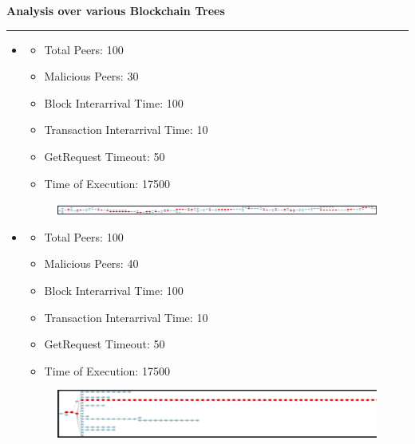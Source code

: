 \documentclass[a4paper,12pt]{article}
\newenvironment{solution}[2][]{%
\begin{mdframed}[linecolor=blue!70!black, linewidth=2pt, roundcorner=10pt, backgroundcolor=yellow!10!white, skipabove=12pt, skipbelow=12pt]%
	\textbf{\large #2}
	\par\noindent\rule{\textwidth}{0.4pt}
}{
\end{mdframed}
}
\begin{document}
\begin{solution}{Analysis over various Blockchain Trees}
\begin{itemize}
	
		\item \begin{itemize}
			\vspace{-7pt}
			\item Total Peers: 100
			\vspace{-7pt}
			\item Malicious Peers: 30
			\vspace{-7pt}
			\item Block Interarrival Time: 100
			\vspace{-7pt}
			\item Transaction Interarrival Time: 10
			\vspace{-7pt}
			\item GetRequest Timeout: 50 
			\vspace{-7pt}
			\item Time of Execution: 17500
		\end{itemize}
	
		 \begin{figure}[H]
				\centering
				\includegraphics[width=\textwidth]{images/i_100_30_10_100_50_SE.png} 
			\end{figure}
	
			\item \begin{itemize}
				\vspace{-7pt}
				\item Total Peers: 100
				\vspace{-7pt}
				\item Malicious Peers: 40
				\vspace{-7pt}
				\item Block Interarrival Time: 100
				\vspace{-7pt}
				\item Transaction Interarrival Time: 10
				\vspace{-7pt}
				\item GetRequest Timeout: 50 
				\vspace{-7pt}
				\item Time of Execution: 17500
			\end{itemize}
		
			 \begin{figure}[H]
					\centering
					\includegraphics[width=\textwidth]{images/i_100_40_10_100_50_SE.png} 
				\end{figure}
	

\end{itemize}
\end{solution}
\end{document}
